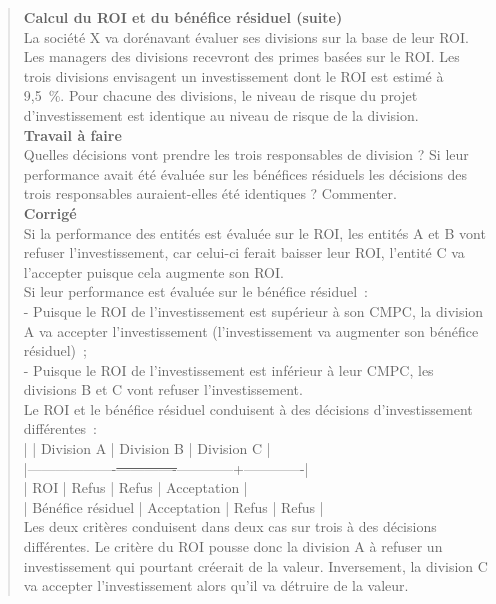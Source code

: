 \documentclass{tufte-handout}
\begin{document}
\begin{enumerate}
\begin{verse}
\textbf{Calcul du ROI et du bénéfice résiduel (suite)}\\
La société X va dorénavant évaluer ses divisions sur la base de leur ROI. Les managers des divisions recevront des primes basées sur le ROI. Les trois divisions envisagent un investissement dont le ROI est estimé à 9,5 \%. Pour chacune des divisions, le niveau de risque du projet d'investissement est identique au niveau de risque de la division.\\
\textbf{Travail à faire}\\
Quelles décisions vont prendre les trois responsables de division ? Si leur performance avait été évaluée sur les bénéfices résiduels les décisions des trois responsables auraient-elles été identiques ? Commenter.\\
\textbf{Corrigé}\\
Si la performance des entités est évaluée sur le ROI, les entités A et B vont refuser l'investissement, car celui-ci ferait baisser leur ROI, l'entité C va l'accepter puisque cela augmente son ROI.\\
Si leur performance est évaluée sur le bénéfice résiduel :\\
- Puisque le ROI de l'investissement est supérieur à son CMPC, la division A va accepter l'investissement (l'investissement va augmenter son bénéfice résiduel) ;\\
- Puisque le ROI de l'investissement est inférieur à leur CMPC, les divisions B et C vont refuser l'investissement.\\
Le ROI et le bénéfice résiduel conduisent à des décisions d'investissement différentes :\\
|                   | Division A  | Division B | Division C  |\\
|-------------------\sout{-------------}------------+-------------|\\
| ROI               | Refus       | Refus      | Acceptation |\\
| Bénéfice résiduel | Acceptation | Refus      | Refus       |\\
Les deux critères conduisent dans deux cas sur trois à des décisions différentes. Le critère du ROI pousse donc la division A à refuser un investissement qui pourtant créerait de la valeur. Inversement, la division C va accepter l'investissement alors qu'il va détruire de la valeur.\\
\end{verse}


\end{enumerate}
\end{document}
